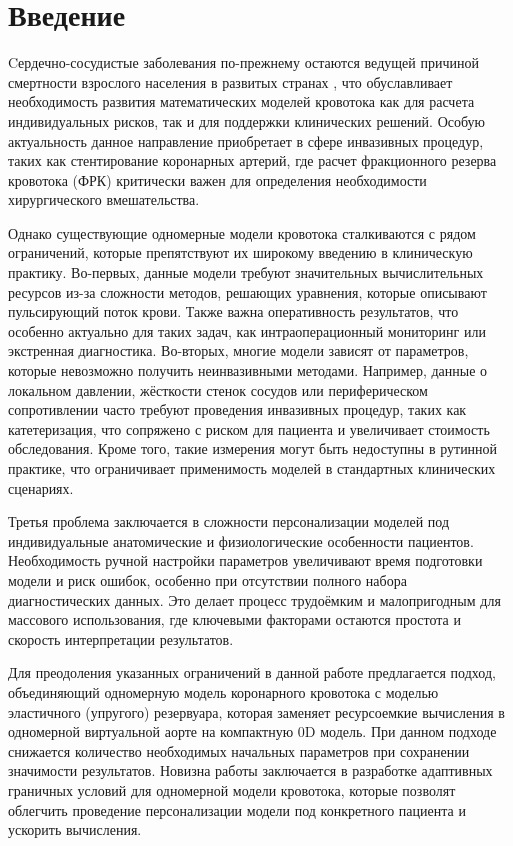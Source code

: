 \chapter*{Введение}
\label{ch:intro}


Cердечно-сосудистые заболевания по-прежнему остаются ведущей причиной смертности взрослого населения в развитых странах \cite{1}, что обуславливает необходимость развития математических моделей кровотока как для расчета индивидуальных рисков, так и для поддержки клинических решений. Особую актуальность данное направление приобретает в сфере инвазивных процедур, таких как стентирование коронарных артерий, где расчет фракционного резерва кровотока (ФРК) критически важен для определения необходимости хирургического вмешательства.

Однако существующие одномерные модели кровотока сталкиваются с рядом ограничений, которые препятствуют их широкому введению в клиническую практику. Во-первых, данные модели требуют значительных вычислительных ресурсов из-за сложности методов, решающих уравнения, которые описывают пульсирующий поток крови. Также важна  оперативность результатов, что особенно актуально для таких задач, как интраоперационный мониторинг или экстренная диагностика. Во-вторых, многие модели зависят от параметров, которые невозможно получить неинвазивными методами. Например, данные о локальном давлении, жёсткости стенок сосудов или периферическом сопротивлении часто требуют проведения инвазивных процедур, таких как катетеризация, что сопряжено с риском для пациента и увеличивает стоимость обследования. Кроме того, такие измерения могут быть недоступны в рутинной практике, что ограничивает применимость моделей в стандартных клинических сценариях.

Третья проблема заключается в сложности персонализации моделей под индивидуальные анатомические и физиологические особенности пациентов. Необходимость ручной настройки параметров увеличивают время подготовки модели и риск ошибок, особенно при отсутствии полного набора диагностических данных. Это делает процесс трудоёмким и малопригодным для массового использования, где ключевыми факторами остаются простота и скорость интерпретации результатов.


Для преодоления указанных ограничений в данной работе предлагается подход, объединяющий одномерную модель коронарного кровотока с моделью эластичного (упругого) резервуара, которая заменяет ресурсоемкие вычисления в одномерной виртуальной аорте на компактную 0D модель. При данном подходе снижается количество необходимых начальных параметров при сохранении значимости результатов. Новизна работы заключается в разработке адаптивных граничных условий для одномерной модели кровотока, которые позволят облегчить проведение персонализации модели под конкретного пациента и ускорить вычисления. 

